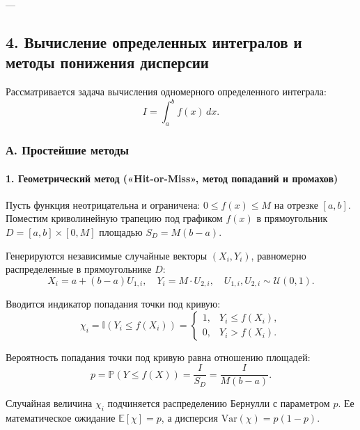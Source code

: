 \documentclass[11pt,a4paper]{article}
\begin{document}
---

\subsection{4. Вычисление определенных интегралов и методы понижения дисперсии}

Рассматривается задача вычисления одномерного определенного интеграла:
\begin{equation}
    I = \int_{a}^{b} f(x)\,dx.
    \label{eq:integral_base}
\end{equation}

\subsubsection{А. Простейшие методы}

\paragraph{1. Геометрический метод («Hit-or-Miss», метод попаданий и промахов)}
Пусть функция неотрицательна и ограничена: $0 \le f(x) \le M$ на отрезке $[a,b]$. Поместим криволинейную трапецию под графиком $f(x)$ в прямоугольник $D = [a,b] \times [0, M]$ площадью $S_D = M(b - a)$.

Генерируются независимые случайные векторы $(X_i, Y_i)$, равномерно распределенные в прямоугольнике $D$:
\begin{equation}
    X_i = a + (b - a) U_{1,i}, \quad Y_i = M \cdot U_{2,i}, \quad U_{1,i}, U_{2,i} \sim \mathcal{U}(0,1).
\end{equation}

Вводится индикатор попадания точки под кривую:
\begin{equation}
    \chi_i = \mathbb{I}(Y_i \le f(X_i)) = \begin{cases} 1, & Y_i \le f(X_i), \\ 0, & Y_i > f(X_i). \end{cases}
\end{equation}

Вероятность попадания точки под кривую равна отношению площадей:
\begin{equation}
    p = \mathbb{P}(Y \le f(X)) = \frac{I}{S_D} = \frac{I}{M(b - a)}.
\end{equation}

Случайная величина $\chi_i$ подчиняется распределению Бернулли с параметром $p$. Ее математическое ожидание $\mathbb{E}[\chi] = p$, а дисперсия $\mathrm{Var}(\chi) = p(1 - p)$.
\end{document}
